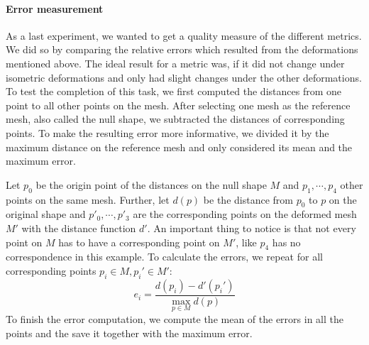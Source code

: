 \paragraph{Error measurement}
As a last experiment, we wanted to get a quality measure of the different metrics.
We did so by comparing the relative errors which resulted from the deformations mentioned above.
The ideal result for a metric was, if it did not change under isometric deformations and only had slight changes under the other deformations.
To test the completion of this task, we first computed the distances from one point to all other points on the mesh.
After selecting one mesh as the reference mesh, also called the null shape, we subtracted the distances of corresponding points.
To make the resulting error more informative, we divided it by the maximum distance on the reference mesh and only considered its mean and the maximum error.
\begin{example}
	Let $p_0$ be the origin point of the distances on the null shape $M$ and $p_1,\cdots,p_4$ other points on the same mesh.
	Further, let $d(p)$ be the distance from $p_0$ to $p$ on the original shape and $p'_0, \cdots, p'_3$ are the corresponding points on the deformed mesh $M'$ with the distance function $d'$.
	An important thing to notice is that not every point on $M$ has to have a corresponding point on $M'$, like $p_4$ has no correspondence in this example.
	To calculate the errors, we repeat for all corresponding points $p_i\in M, p_i' \in M'$:
	$$e_i = \frac{d(p_i) - d'(p_i')}{\max_{p\in M} d(p)}$$
	\noindent To finish the error computation, we compute the mean of the errors in all the points and the save it together with the maximum error.
\end{example}

